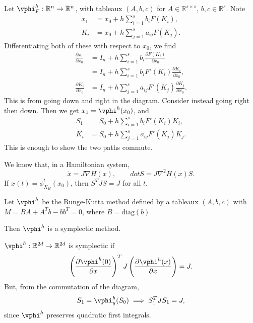 \documentclass[12pt]{article}
\begin{document}
\begin{proofbox}
	Let $\vphi_F^{h} : \mathbb{R}^{n} \to \mathbb{R}^{n}$, with tableaux $(A, b, c)$ for $A \in \mathbb{R}^{s \times s}$, $b, c \in \mathbb{R}^{s}$. Note
	\begin{align*}
		x_1 &= x_0 + h \sum_{i = 1}^{s} b_i F(K_i), \\
		K_i &= x_0 + h \sum_{j = 1}^{s} a_{ij} F(K_j).
	\end{align*}
	Differentiating both of these with respect to $x_0$, we find
	\begin{align*}
		\frac{\partial x_1}{\partial x_0} &= I_n + h \sum_{i = 1}^{s} b_i \frac{\partial F(K_i)}{\partial x_0} \\
						  &= I_n + h \sum_{i = 1}^{s} b_i F'(K_i) \frac{\partial K_i}{\partial x_0}, \\
		\frac{\partial K_i}{\partial x_0} &= I_n + h \sum_{j = 1}^{s} a_{ij} F'(K_j) \frac{\partial K_j}{\partial x_0}.
	\end{align*}
	This is from going down and right in the diagram. Consider instead going right then down. Then we get $x_1 = \vphi^{h}(x_0)$, and
	\begin{align*}
		S_1 &= S_0 + h \sum_{i = 1}^{s} b_i F'(K_i) K_i, \\
		K_i &= S_0 + h \sum_{j = 1}^{s} a_{ij} F'(K_j) K_j.
	\end{align*}
	This is enough to show the two paths commute.
\end{proofbox}

We know that, in a Hamiltonian system,
\[
\dot x = J \nabla H(x), \qquad dot S = J \nabla^2 H(x) S.
\]
If $x(t) = \phi_{X_H}^{t}(x_0)$, then $S^{T}JS = J$ for all $t$.

\begin{theorem}
	Let $\vphi^{h}$ be the Runge-Kutta method defined by a tableaux $(A, b, c)$ with $M = BA + A^{T}b - b b^{T} = 0$, where $B = \mathrm{diag}(b)$.

	Then $\vphi^{h}$ is a symplectic method.
\end{theorem}

\begin{proofbox}
	$\vphi^{h} : \mathbb{R}^{2d} \to \mathbb{R}^{2d}$ is symplectic if
	\[
	\left( \frac{\partial \vphi^{h}(0)}{\partial x} \right)^{T} J \left( \frac{\partial \vphi^{h}(x)}{\partial x} \right) = J.
	\]
	But, from the commutation of the diagram,
	\[
	S_1 = \vphi^{h}_y(S_0) \implies S_1^{T} J S_1 = J,
	\]
	since $\vphi^{h}$ preserves quadratic first integrals.
\end{proofbox}
\end{document}
